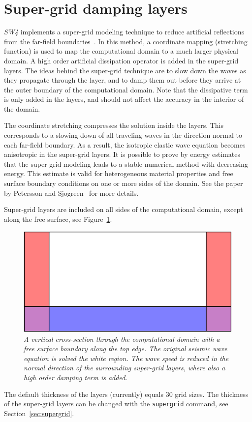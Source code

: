 \documentclass[11pt]{report}
\begin{document}
\section{Super-grid damping layers}

\emph{SW4} implements a super-grid modeling technique to reduce artificial reflections from the
far-field boundaries~\cite{AppCol-09, PetSjo-13}. In this method, a coordinate mapping (stretching
function) is used to map the computational domain to a much larger physical domain. A high order
artificial dissipation operator is added in the super-grid layers. The ideas behind the super-grid
technique are to slow down the waves as they propagate through the layer, and to damp them out
before they arrive at the outer boundary of the computational domain. Note that the dissipative term
is only added in the layers, and should not affect the accuracy in the interior of the domain.

The coordinate stretching compresses the solution inside the layers. This corresponds to a slowing
down of all traveling waves in the direction normal to each far-field boundary. As a result, the
isotropic elastic wave equation becomes anisotropic in the super-grid layers. It is possible to
prove by energy estimates that the super-grid modeling leads to a stable numerical method with
decreasing energy. This estimate is valid for heterogeneous material properties and free surface
boundary conditions on one or more sides of the domain. See the paper by Petersson and
Sjogreen~\cite{PetSjo-13} for more details.

Super-grid layers are included on all sides of the computational domain, except along the
free surface, see Figure~\ref{fig:layout}.
\begin{figure}[th]
\begin{center}
\includegraphics[width=0.65\linewidth]{layout.eps}
\caption{\em A vertical cross-section through the computational domain with a free surface boundary
  along the top edge. The original seismic wave equation is solved the white region. The wave speed
  is reduced in the normal direction of the surrounding super-grid layers, where also a high order
  damping term is added.}\label{fig:layout}
\end{center}
\end{figure}
The default thickness of the layers (currently) equals 30 grid sizes. The thickness of the
super-grid layers can be changed with the {\tt supergrid} command, see Section~\ref{sec:supergrid}.
\end{document}
